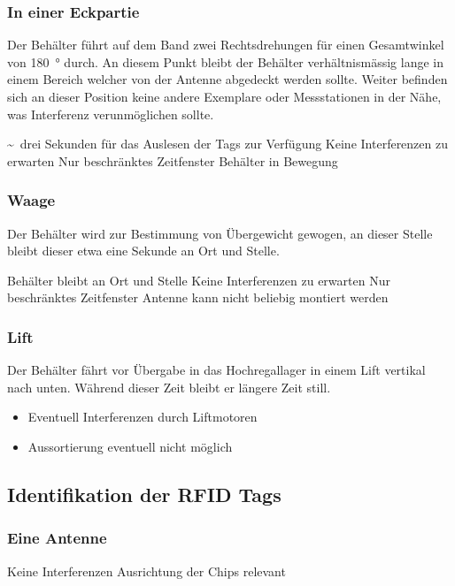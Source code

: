\subsubsection{In einer Eckpartie}
Der Behälter führt auf dem Band zwei Rechtsdrehungen für einen Gesamtwinkel von \SI{180}{\degree} durch. An diesem Punkt bleibt der Behälter verhältnismässig lange in einem Bereich welcher von der Antenne abgedeckt werden sollte. Weiter befinden sich an dieser Position keine andere Exemplare oder Messstationen in der Nähe, was Interferenz verunmöglichen sollte.
\begin{itemize}
	\pro \textasciitilde\ drei Sekunden für das Auslesen der Tags zur Verfügung
	\pro Keine Interferenzen zu erwarten
	\con Nur beschränktes Zeitfenster
	\con Behälter in Bewegung
\end{itemize}

\subsubsection{Waage}
Der Behälter wird zur Bestimmung von Übergewicht gewogen, an dieser Stelle bleibt dieser etwa eine Sekunde an Ort und Stelle.
\begin{itemize}
	\pro Behälter bleibt an Ort und Stelle
	\pro Keine Interferenzen zu erwarten
	\con Nur beschränktes Zeitfenster
	\con Antenne kann nicht beliebig montiert werden
\end{itemize}

\subsubsection{Lift}
Der Behälter fährt vor Übergabe in das Hochregallager in einem Lift vertikal nach unten. Während dieser Zeit bleibt er längere Zeit still.
\begin{itemize}
	\pro Behälter bleibt an Ort und Stelle
	\pro Grosses Zeitfenster
	\con Beschränkter Platz da Lift
	\con Spät im Prozess
	\item Eventuell Interferenzen durch Liftmotoren
	\item Aussortierung eventuell nicht möglich
\end{itemize}

\subsection{Identifikation der RFID Tags}

\subsubsection{Eine Antenne}
\begin{itemize}
	\pro Keine Interferenzen
	\con Ausrichtung der Chips relevant
\end{itemize}

